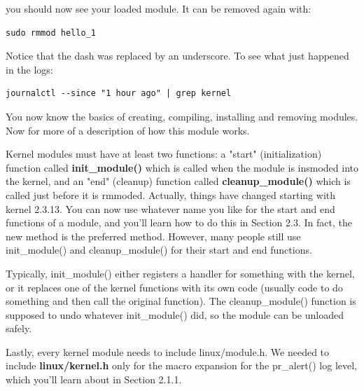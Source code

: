 \documentclass[11pt]{article}
\begin{document}
you should now see your loaded module. It can be removed again with:

\begin{verbatim}
sudo rmmod hello_1
\end{verbatim}

Notice that the dash was replaced by an underscore. To see what just happened in the logs:

\begin{verbatim}
journalctl --since "1 hour ago" | grep kernel
\end{verbatim}

You now know the basics of creating, compiling, installing and removing modules. Now for more of a description of how this module works.

Kernel modules must have at least two functions: a "start" (initialization) function called \textbf{init\_module()} which is called when the module is insmoded into the kernel, and an "end" (cleanup) function called \textbf{cleanup\_module()} which is called just before it is rmmoded. Actually, things have changed starting with kernel 2.3.13. You can now use whatever name you like for the
start and end functions of a module, and you'll learn how to do this in Section 2.3. In fact, the new method is the preferred method. However, many people still use init\_module() and cleanup\_module() for their start and end functions.

Typically, init\_module() either registers a handler for something with the kernel, or it replaces one of the kernel functions with its own code (usually code to do something and then call the original function). The cleanup\_module() function is supposed to undo whatever init\_module() did, so the module can be unloaded safely.

Lastly, every kernel module needs to include linux/module.h. We needed to include \textbf{linux/kernel.h} only for the macro expansion for the pr\_alert() log level, which you'll learn about in Section 2.1.1.
\end{document}
